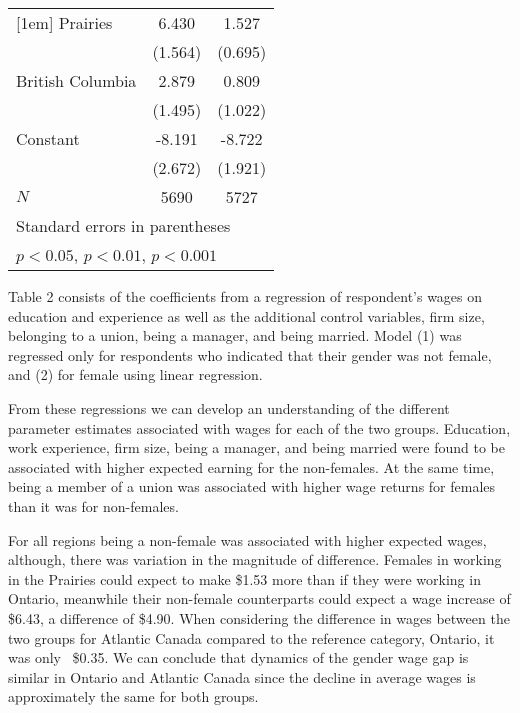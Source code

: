\documentclass[11pt]{article}
\begin{document}
{{\begin{table}[t]
\begin{tabular}{l*{2}{c}}
[1em]
\hspace{\parindent} \hspace{\parindent}Prairies    &       6.430\sym{***}&       1.527\sym{*}  \\
            &     (1.564)         &     (0.695)         \\
[1em]
\hspace{\parindent} \hspace{\parindent}British Columbia    &       2.879         &       0.809         \\
            &     (1.495)         &     (1.022)         \\
[1em]
Constant      &      -8.191\sym{**} &      -8.722\sym{***}\\
            &     (2.672)         &     (1.921)         \\
\hline
\(N\)       &        5690         &        5727         \\
\hline\hline
\multicolumn{3}{l}{\footnotesize Standard errors in parentheses}\\
\multicolumn{3}{l}{\footnotesize \sym{*} \(p<0.05\), \sym{**} \(p<0.01\), \sym{***} \(p<0.001\)}\\
\end{tabular}
\end{table}
}


Table 2 consists of the coefficients from a regression of respondent's wages on education and experience as well as the additional control variables, firm size, belonging to a union, being a manager, and being married. Model (1) was regressed only for respondents who indicated that their gender was not female, and (2) for female using linear regression.

From these regressions we can develop an understanding of the different parameter estimates associated with wages for each of the two groups. Education, work experience, firm size, being a manager, and being married were found to be associated with higher expected earning for the non-females. At the same time, being a member of a union was associated with higher wage returns for females than it was for non-females. 

For all regions being a non-female was associated with higher expected wages, although, there was variation in the magnitude of difference. Females in working in the Prairies could expect to make \$1.53 more than if they were working in Ontario, meanwhile their non-female counterparts could expect a wage increase of \$6.43, a difference of \$4.90. When considering the difference in wages between the two groups for Atlantic Canada compared to the reference category, Ontario, it was only ~\$0.35. We can conclude that dynamics of the gender wage gap is similar in Ontario and Atlantic Canada since the decline in average wages is approximately the same for both groups.

}
\end{document}
